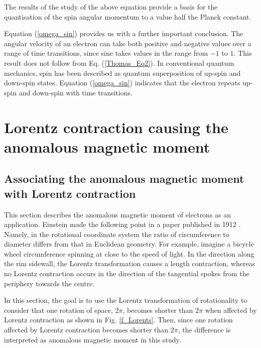 \documentclass[%
 reprint,
 amsmath,amssymb,
 aps,
]{revtex4-1}
\numberwithin{equation}{section}%
\begin{document}
The results of the study of the above equation provide a basis for the quantisation of the spin angular momentum to a value half the Planck constant.


Equation (\ref{omega_sin}) provides us with a further important conclusion. The angular velocity of an electron can take both positive and negative values over a range of time transitions, since sine takes values in the range from $-1$ to $1$. This result does not follow from Eq. (\ref{Thomas_Eq2}). In conventional quantum mechanics, spin has been described as quantum superposition of up-spin and down-spin states. Equation (\ref{omega_sin}) indicates that the electron repeats up-spin and down-spin with time transitions.

\section{Lorentz contraction causing the anomalous magnetic moment}

\subsection{Associating the anomalous magnetic moment with Lorentz contraction}


This section describes the anomalous magnetic moment of electrons as an application. Einstein made the following point in a paper published in 1912 \cite{Einstein}. Namely, in the rotational coordinate system the ratio of circumference to diameter differs from that in Euclidean geometry. For example, imagine a bicycle wheel circumference spinning at close to the speed of light. In the direction along the rim sidewall, the Lorentz transformation causes a length contraction, whereas no Lorentz contraction occurs in the direction of the tangential spokes from the periphery towards the centre.

In this section, the goal is to use the Lorentz transformation of rotationality to consider that one rotation of space, $2\pi$, becomes shorter than $2\pi$ when affected by Lorentz contraction as shown in Fig. \ref{f_Lorents}.  Then, since one rotation affected by Lorentz contraction becomes shorter than $2\pi$, the difference is interpreted as anomalous magnetic moment in this study.
\end{document}
